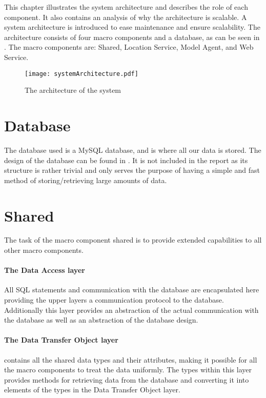 This chapter illustrates the system architecture and describes the role of each component.
It also contains an analysis of why the architecture is scalable.
A system architecture is introduced to ease maintenance and ensure scalability.
The architecture consists of four macro components and a database, as can be seen in . The macro components are: Shared, Location Service, Model Agent, and Web Service.

\begin{figure}
\texttt{[image: systemArchitecture.pdf]}
\caption{The architecture of the system}
\label{fig:architecture}
\end{figure}

\section{Database} The database used is a MySQL database, and is where all our data is stored.
The design of the database can be found in .
It is not included in the report as its structure is rather trivial and only serves the purpose of having a simple and fast method of storing/retrieving large amounts of data.

\section{Shared}
The task of the macro component shared is to provide extended capabilities to all other macro components.

\paragraph{The Data Access layer} All SQL statements and communication with the database are encapsulated here providing the upper layers a communication protocol to the database.
Additionally this layer provides an abstraction of the actual communication with the database as well as an abstraction of the database design.

\paragraph{The Data Transfer Object layer} contains all the shared data types and their attributes, making it possible for all the macro components to treat the data uniformly.
The types within this layer provides methods for retrieving data from the database and converting it into elements of the types in the Data Transfer Object layer.


